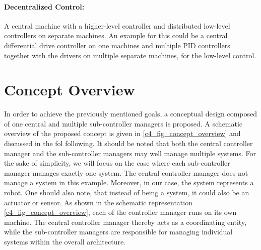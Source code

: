 \paragraph{Decentralized Control:}
A central machine with a higher-level controller and distributed low-level controllers on separate machines. An example for this could be a central differential drive controller on one machines and multiple PID controllers together with the drivers on multiple separate machines, for the low-level control. 


\section{Concept Overview}
In order to achieve the previously mentioned goals, a conceptual design composed of one central and multiple sub-controller managers is proposed. A schematic overview of the proposed concept is given in \autoref{c4_fig_concept_overview} and discussed in the fol following. It should be noted that both the central controller manager and the sub-controller managers may well manage multiple systems. For the sake of simplicity, we will focus on the case where each sub-controller manager manages exactly one system. The central controller manager does not manage a system in this example. Moreover, in our case, the system represents a robot. One should also note, that instead of being a system, it could also be an actuator or sensor.\newline
As shown in the schematic representation \autoref{c4_fig_concept_overview}, each of the controller manager runs on its own machine. The central controller manager thereby acts as a coordinating entity, while the sub-controller managers are responsible for managing individual systems within the overall architecture.\newline
